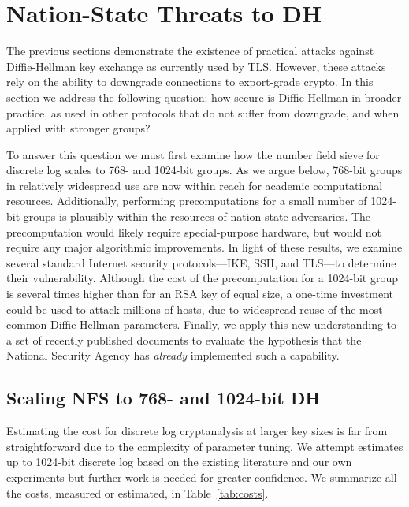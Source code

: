 \section{Nation-State Threats to DH}
\label{sec:nationstate}

The previous sections demonstrate the existence of practical attacks against
Diffie-Hellman key exchange as currently used by TLS\@. However, these
attacks rely on the ability to downgrade connections to export-grade crypto.
In this section we address the following question: how secure is
Diffie-Hellman in broader practice, as used in other protocols that do not
suffer from downgrade, and when applied with stronger groups?



To answer this question we must first examine how the number field sieve for
discrete log scales to 768- and 1024-bit groups. As we argue below, 768-bit
groups in relatively widespread use are now within reach for academic
computational resources. Additionally, performing precomputations for a small
number of 1024-bit groups is plausibly within the resources of nation-state
adversaries. The precomputation would likely require special-purpose
hardware, but would not require any major algorithmic improvements. In light
of these results, we examine several standard Internet security
protocols---IKE, SSH, and TLS---to determine their vulnerability. Although
the cost of the precomputation for a 1024-bit group is several times higher
than for an RSA key of equal size, a one-time investment could be used to
attack millions of hosts, due to widespread reuse of the most common
Diffie-Hellman parameters. Finally, we apply this new understanding to a set
of recently published documents to evaluate the hypothesis that the National
Security Agency has {\em already} implemented such a capability.

\subsection{Scaling NFS to 768- and 1024-bit DH}

Estimating the cost for discrete log cryptanalysis at larger key sizes is far
from straightforward due to the complexity of parameter tuning. We attempt
estimates up to 1024-bit discrete log based on the existing literature and
our own experiments but further work is needed for greater confidence. We
summarize all the costs, measured or estimated, in Table~\ref{tab:costs}.

